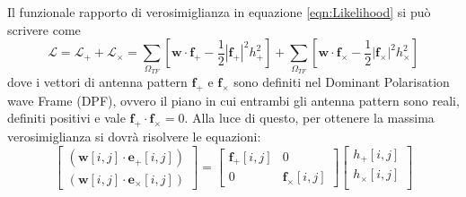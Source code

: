 Il funzionale rapporto di verosimiglianza in equazione \ref{eqn:Likelihood} si può scrivere come
\begin{equation}
	\mathcal{L} =  \mathcal{L}_+ + \mathcal{L}_\times = \sum_{\Omega_{TF}}\left[ \mathbf{w} \cdot \mathbf{f}_+ - \frac{1}{2}|\mathbf{f}_+|^2h_+^2\right] + \sum_{\Omega_{TF}}\left[ \mathbf{w} \cdot \mathbf{f}_\times - \frac{1}{2}|\mathbf{f}_\times|^2h_\times^2\right]
	\label{eqn:label_separated}
\end{equation}
dove i vettori di antenna pattern $\mathbf{f}_+$ e $\mathbf{f}_\times$ sono definiti nel Dominant Polarisation wave Frame (DPF), ovvero il piano in cui entrambi gli antenna pattern sono reali, definiti positivi e vale $\mathbf{f}_+ \cdot \mathbf{f}_\times = 0$.  Alla luce di questo, per ottenere la massima verosimiglianza si dovrà risolvere le equazioni:
\begin{equation}
	\begin{bmatrix}
	(\mathbf{w}[i,j]\cdot \mathbf{e}_+[i,j])\\
	(\mathbf{w}[i,j]\cdot \mathbf{e}_\times[i,j])
	\end{bmatrix}
	=
	\begin{bmatrix}
	\mathbf{f}_+[i,j]	&0\\
	0					&\mathbf{f}_\times[i,j]
	\end{bmatrix}
	\begin{bmatrix}
	h_+[i,j]\\
	h_\times[i,j]\\
	\end{bmatrix}
	\label{eqn:sistema_soluzione}
\end{equation}

